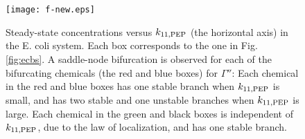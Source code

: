 \documentclass[ amsmath,amssymb,nofootinbib
]{revtex4-1}
\begin{document}
 




\begin{figure}[h]
\texttt{[image: f-new.eps]}
\caption{ Steady-state concentrations versus $ k_{11,\rm PEP}$ (the horizontal axis) in the E. coli system. Each box corresponds to the one in Fig. \ref{fig:ecbs}.  A saddle-node bifurcation is observed for each of the bifurcating chemicals (the red and blue boxes) for  $\Gamma''$:  {Each chemical in the red and blue boxes has  one stable branch when  $ k_{11,\rm PEP}$ is small, and has two stable and one unstable branches when  $ k_{11,\rm PEP}$ is large.  Each chemical in the green and black boxes  is independent of  $ k_{11,\rm PEP}$, due to the law of localization, and has one stable branch. }}
\label{fig:ecplot}
\end{figure}
\end{document}
